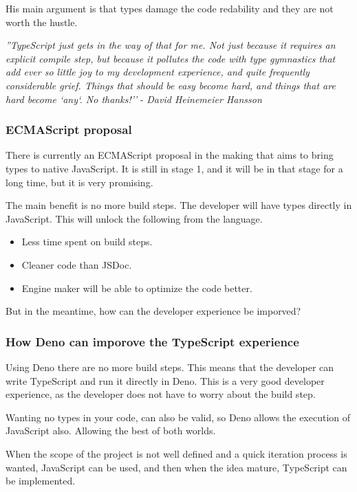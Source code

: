\documentclass[10pt,journal,compsoc]{IEEEtran}
\begin{document}
His main argument is that types damage the code redability and they are not worth the hustle.

\textit{''TypeScript just gets in the way of that for me. Not just because it requires an explicit compile step, but because it pollutes the code with type gymnastics that add ever so little joy to my development experience, and quite frequently considerable grief. Things that should be easy become hard, and things that are hard become `any`. No thanks!''} - \textit{David Heinemeier Hansson} \cite{TurboTS}

\subsubsection{ECMAScript proposal}

There is currently an ECMAScript proposal in the making that aims to bring types to native JavaScript. It is still in stage 1, and it will be in that stage for a long time, but it is very promising.

The main benefit is no more build steps. The developer will have types directly in JavaScript. This will unlock the following from the language.

\begin{itemize}
    \item Less time spent on build steps.
    \item Cleaner code than JSDoc.
    \item Engine maker will be able to optimize the code better.
\end{itemize}

But in the meantime, how can the developer experience be imporved?

\subsubsection{How Deno can imporove the TypeScript experience}

Using Deno there are no more build steps. This means that the developer can write TypeScript and run it directly in Deno. This is a very good developer experience, as the developer does not have to worry about the build step.

Wanting no types in your code, can also be valid, so Deno allows the execution of JavaScript also. Allowing the best of both worlds.

When the scope of the project is not well defined and a quick iteration process is wanted, JavaScript can be used, and then when the idea mature, TypeScript can be implemented.
\end{document}
